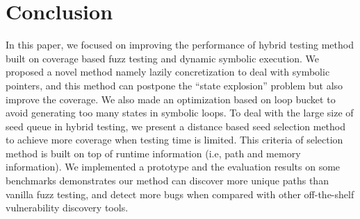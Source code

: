 \documentclass{cta-author}
\begin{document}
\section{Conclusion} \label{sec:conclusion}
In this paper, we focused on improving the performance of hybrid testing method built on coverage based fuzz testing and dynamic symbolic execution. We proposed a novel method namely lazily concretization to deal with symbolic pointers, and this method can postpone the ``state explosion'' problem but also improve the coverage. We also made an optimization based on loop bucket to avoid generating too many states in symbolic loops. To deal with the large size of seed queue in hybrid testing, we present a distance based seed selection method to achieve more coverage when testing time is limited. This criteria of selection method is built on top of runtime information (i.e, path and memory information). We implemented a prototype and the evaluation results on some benchmarks demonstrates our method can discover more unique paths than vanilla fuzz testing, and detect more bugs when compared with other off-the-shelf vulnerability discovery tools.
\end{document}
